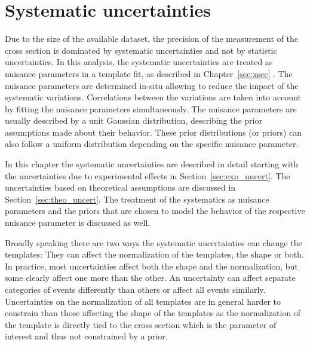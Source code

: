 
\chapter{Systematic uncertainties}
\label{sec:syst_uncert}

Due to the size of the available dataset, the precision of the measurement of the \ttbar cross section is dominated by systematic uncertainties and not by statistic uncertainties.
In this analysis, the systematic uncertainties are treated as nuisance parameters in a
template fit, as described in Chapter~\ref{sec:xsec} . The nuisance parameters are determined in-situ allowing to reduce the impact of the systematic variations. 
Correlations between the variations are taken into account by fitting the nuisance parameters simultaneously.
The nuisance parameters are usually described by a unit Gaussian distribution, describing the prior assumptions made about their behavior.
These prior distributions (or priors) can also follow a uniform distribution depending on the specific nuisance parameter.

In this chapter the systematic uncertainties are described in detail starting with the uncertainties due to experimental effects in Section~\ref{sec:exp_uncert}.
The uncertainties based on theoretical assumptions are discussed in Section~\ref{sec:theo_uncert}. The treatment of the systematics as nuisance
parameters and the priors that are chosen to model the behavior of the respective nuisance parameter is discussed as well.

Broadly speaking there are two ways the systematic uncertainties can change the templates: They can affect the normalization of the templates, the shape or both.
In practice, most uncertainties affect both the shape and the normalization, but some clearly affect one more than the other.
An uncertainty can affect separate categories of events differently than others or affect all events similarly.
Uncertainties on the normalization of all templates are in general harder to constrain than those affecting the shape of the templates as the normalization of the
\ttbar template is directly tied to the cross section which is the parameter of interest and thus not constrained by a prior. 

